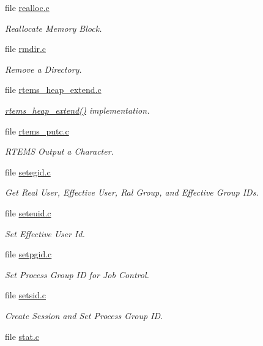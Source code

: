 \begin{DoxyCompactItemize}
file \mbox{\hyperlink{realloc_8c}{realloc.\+c}}
\begin{DoxyCompactList}\small\item\em Reallocate Memory Block. \end{DoxyCompactList}\item 
file \mbox{\hyperlink{rmdir_8c}{rmdir.\+c}}
\begin{DoxyCompactList}\small\item\em Remove a Directory. \end{DoxyCompactList}\item 
file \mbox{\hyperlink{rtems__heap__extend_8c}{rtems\+\_\+heap\+\_\+extend.\+c}}
\begin{DoxyCompactList}\small\item\em \mbox{\hyperlink{malloc_8h_af136cb77bfa16962a04bf148db5fe2db}{rtems\+\_\+heap\+\_\+extend()}} implementation. \end{DoxyCompactList}\item 
file \mbox{\hyperlink{rtems__putc_8c}{rtems\+\_\+putc.\+c}}
\begin{DoxyCompactList}\small\item\em R\+T\+E\+MS Output a Character. \end{DoxyCompactList}\item 
file \mbox{\hyperlink{setegid_8c}{setegid.\+c}}
\begin{DoxyCompactList}\small\item\em Get Real User, Effective User, Ral Group, and Effective Group I\+Ds. \end{DoxyCompactList}\item 
file \mbox{\hyperlink{seteuid_8c}{seteuid.\+c}}
\begin{DoxyCompactList}\small\item\em Set Effective User Id. \end{DoxyCompactList}\item 
file \mbox{\hyperlink{setpgid_8c}{setpgid.\+c}}
\begin{DoxyCompactList}\small\item\em Set Process Group ID for Job Control. \end{DoxyCompactList}\item 
file \mbox{\hyperlink{setsid_8c}{setsid.\+c}}
\begin{DoxyCompactList}\small\item\em Create Session and Set Process Group ID. \end{DoxyCompactList}\item 
file \mbox{\hyperlink{stat_8c}{stat.\+c}}

\end{DoxyCompactItemize}
